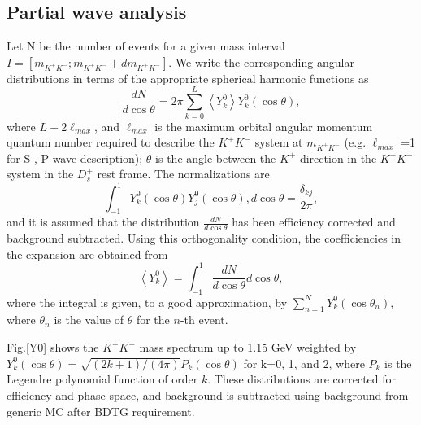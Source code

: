 \subsection{Partial wave analysis}
\par{Let N be the number of events for a given mass interval $I=[m_{K^{+}K^{-}}; m_{K^{+}K^{-}} + dm_{K^{+}K^{-}}]$. We write the corresponding angular distributions in terms of the appropriate spherical harmonic functions as
    \begin{equation}
        \frac{dN}{d\cos\theta} = 2\pi\sum_{k=0}^L\left\langle Y_{k}^{0}\right\rangle Y_{k}^{0}(\cos\theta),\label{expansion}
    \end{equation}
    where $L - 2 \ell_{max}$, and $\ell_{max}$ is the maximum orbital angular momentum quantum number required to describe the $K^{+}K^{-}$ system at $m_{K^{+}K^{-}}$ (e.g. $\ell_{max}$ =1 for S-, P-wave description); $\theta$ is the angle between the $K^{+}$ direction in the $K^{+}K^{-}$ system in the $D_{s}^{+}$ rest frame. 
    The normalizations are 
    \begin{equation}
        \int_{-1}^{1}Y_{k}^{0}(\cos\theta)Y_{j}^{0}(\cos\theta), d\cos\theta  = \frac{\delta_{kj}}{2\pi},\label{sh-normalizations}
    \end{equation}
    and it is  assumed that the distribution $\frac{dN}{d\cos\theta}$ has been efficiency corrected and background subtracted.
    Using this orthogonality condition, the coefficiencies in the expansion are obtained from 
    \begin{equation}
        \left\langle Y_{k}^{0} \right\rangle = \int_{-1}^{1} \frac{dN}{d\cos\theta} d\cos\theta,\label{expansion-coefficiencies}
    \end{equation}
    where the integral is given, to a good approximation, by $\sum_{n=1}^{N}Y_{k}^{0}(\cos\theta_{n})$, where $\theta_{n}$ is the value of $\theta$ for the $n$-th event.
    
    Fig.\ref{Y0} shows the $K^{+}K^{-}$ mass spectrum up to 1.15 GeV weighted by $Y_{k}^{0}(\cos\theta) = \sqrt{(2k+1)/(4\pi)}P_{k}(\cos\theta)$ for k=0, 1, and 2, where $P_{k}$ is the Legendre polynomial function of order $k$. These distributions are corrected for efficiency and phase space, and background is subtracted using background from generic MC after BDTG requirement.
    
}
